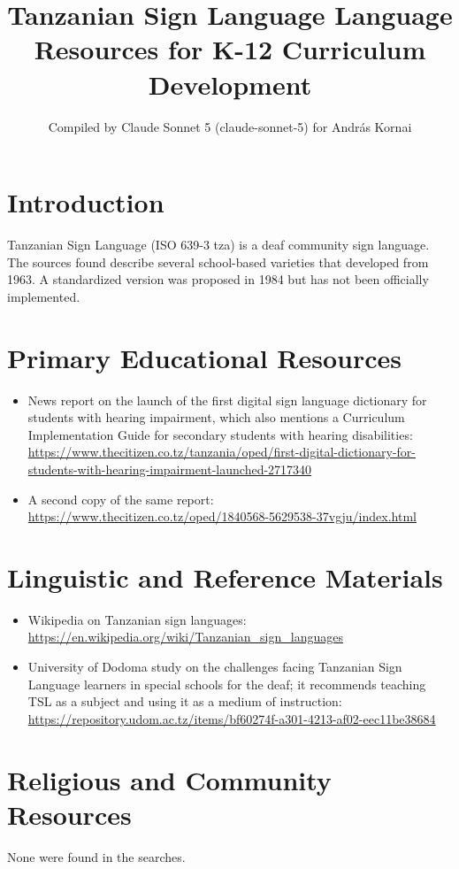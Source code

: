\documentclass[12pt]{article}
\title{Tanzanian Sign Language Language Resources for K-12 Curriculum Development}
\author{Compiled by Claude Sonnet 5 (claude-sonnet-5) for Andr\'as Kornai}
\date{}
\begin{document}
\maketitle

\section{Introduction}
Tanzanian Sign Language (ISO 639-3 tza) is a deaf community sign language. The sources found describe several school-based varieties that developed from 1963. A standardized version was proposed in 1984 but has not been officially implemented.

\section{Primary Educational Resources}
\begin{itemize}
\item News report on the launch of the first digital sign language dictionary for students with hearing impairment, which also mentions a Curriculum Implementation Guide for secondary students with hearing disabilities: \url{https://www.thecitizen.co.tz/tanzania/oped/first-digital-dictionary-for-students-with-hearing-impairment-launched-2717340}
\item A second copy of the same report: \url{https://www.thecitizen.co.tz/oped/1840568-5629538-37vgju/index.html}
\end{itemize}

\section{Linguistic and Reference Materials}
\begin{itemize}
\item Wikipedia on Tanzanian sign languages: \url{https://en.wikipedia.org/wiki/Tanzanian_sign_languages}
\item University of Dodoma study on the challenges facing Tanzanian Sign Language learners in special schools for the deaf; it recommends teaching TSL as a subject and using it as a medium of instruction: \url{https://repository.udom.ac.tz/items/bf60274f-a301-4213-af02-eec11be38684}
\end{itemize}

\section{Religious and Community Resources}
None were found in the searches.
\end{document}
